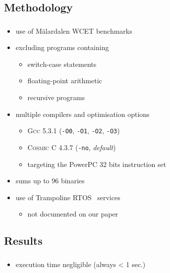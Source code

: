 \documentclass{beamer}
\begin{document}
  \subsection{Methodology}
  \begin{frame}
    \frametitle{\secname}
    \framesubtitle{\subsecname}

    \begin{itemize}
      \item use of Mälardalen WCET benchmarks
      \item excluding programs containing %
        \begin{itemize}
          \item switch-case statements %
          \item floating-point arithmetic %
          \item recursive programs
        \end{itemize}
      \item multiple compilers and optimisation options
        \begin{itemize}
          \item \textsc{Gcc} 5.3.1 (\texttt{-O0}, \texttt{-O1}, \texttt{-O2}, \texttt{-O3})
          \item \textsc{Cosmic C} 4.3.7 (\texttt{-no}, \emph{default})
          \item targeting the PowerPC 32 bits instruction set
        \end{itemize}
      \item sums up to 96 binaries

      \vspace{1em}
      \item use of Trampoline RTOS~\cite{BBF06} services
        \begin{itemize}
          \item not documented on our paper
        \end{itemize}
    \end{itemize}
  \end{frame}
  
  \subsection{Results}
  \begin{frame}
    \frametitle{\secname}
    \framesubtitle{\subsecname}

    \begin{table}
      \centering
      \tiny
      
    \end{table}
    
    \begin{itemize}
      \item execution time negligible (always < 1 sec.)
    \end{itemize}
  \end{frame}
\end{document}
